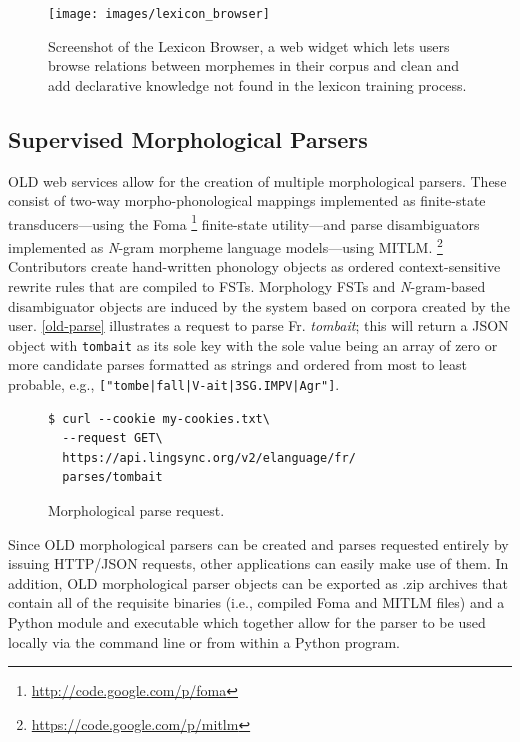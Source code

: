 \documentclass[11pt]{article}
\begin{document}
\begin{figure}
\begin{center}
\texttt{[image: images/lexicon\_browser]}
\caption{Screenshot of the Lexicon Browser, a web widget which lets users browse relations between morphemes in their corpus and clean and add declarative knowledge not found in the lexicon training process.}
\label{lexicon_browser_screenshot}
\end{center}
\end{figure}






\subsection{Supervised Morphological Parsers}

OLD web services allow for the creation of multiple morphological parsers.
These consist of two-way morpho-phonological mappings implemented as
finite-state transducers---using the Foma%
\footnote{\url{http://code.google.com/p/foma}} %
finite-state utility---and parse disambiguators implemented as \textit{N}-gram
morpheme language models---using MITLM.%
\footnote{\url{https://code.google.com/p/mitlm}}
Contributors create hand-written phonology objects as ordered context-sensitive
rewrite rules that are compiled to FSTs. Morphology FSTs and \textit{N}-gram-based
disambiguator objects are induced by the system based on corpora created by the 
user. \autoref{old-parse} illustrates a request to parse Fr. \textit{tombait};
this will return a JSON object with \texttt{tombait} as its sole key with the 
sole value being an array of zero or more candidate parses formatted as strings and 
ordered from most to least probable, e.g., \texttt{["tombe|fall|V-ait|3SG.IMPV|Agr"]}.

\begin{figure}[h]
\scriptsize
\begin{verbatim}
$ curl --cookie my-cookies.txt\
  --request GET\
  https://api.lingsync.org/v2/elanguage/fr/
  parses/tombait
\end{verbatim}
\normalsize
\caption{Morphological parse request.}
\label{old-parse}
\end{figure}

Since OLD morphological parsers can be created and parses requested entirely by
issuing HTTP/JSON requests, other applications can easily make use of them. In
addition, OLD morphological parser objects can be exported as .zip archives
that contain all of the requisite binaries (i.e., compiled Foma and MITLM
files) and a Python module and executable which together allow for the parser
to be used locally via the command line or from within a Python program.
\end{document}
